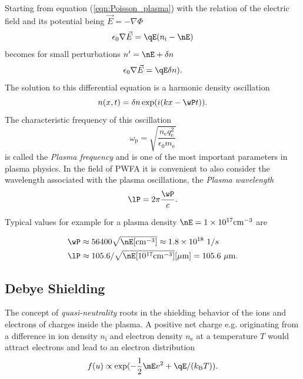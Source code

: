Starting from equation (\ref{eqn:Poisson_plasma}) with the relation of the electric field and its potential being $\vec{E}=-\nabla \Phi$ 
\begin{equation}
\epsilon_0 \nabla \vec{E}=\qE (n_\mathrm{i}-\nE)
\end{equation}
becomes for small perturbations $n'=\nE+\delta n$
\begin{equation}
\epsilon_0 \nabla \vec{E}=\qE \delta n).
\end{equation}
The solution to this differential equation is a harmonic density oscillation 
\begin{equation}
n(x,t)=\delta n \exp(i(kx-\wP t)).
\end{equation}
The characteristic frequency of this oscillation 
\begin{equation}
\omega_\mathrm{p}=\sqrt{\frac{n_\mathrm{e}q_\mathrm{e}^2}{\epsilon_0 m_\mathrm{e}}}
\end{equation}
is called the \textit{Plasma frequency} and is one of the most important parameters in plasma physics. 
In the field of PWFA it is convenient to also consider the wavelength associated with the plasma oscillations, 
the \textit{Plasma wavelength}
\begin{equation}
\lP=2\pi\frac{\wP}{c}.
\end{equation}

Typical values for example for a plasma density $\nE=1\times10^{17}\mathrm{cm}^{-3}$ are

\begin{align*}
\wP &\approx 56400 \sqrt{\nE [\mathrm{cm}^{-3}]} \approx 1.8\times10^{18}\ 1/s\\
\lP & \approx 105.6 /\sqrt{\nE [10^{17} \mathrm{cm}^{-3} ]} [\mu\mathrm{m}] = 105.6\ \mu\mathrm{m}.
\end{align*} 

\subsection*{Debye Shielding}
The concept of \textit{quasi-neutrality} roots in the shielding behavior of the ions and electrons of charges inside the plasma. 
A positive net charge e.g. originating from a difference in ion density $n_\mathrm{i}$ and electron density $n_\mathrm{e}$ at a temperature $T$
would attract electrons and lead to an electron distribution 
\begin{equation}
f(u) \propto \exp(-\frac{1}{2}\mE v^2+\qE/( k_\mathrm{B}T)).
\end{equation}


